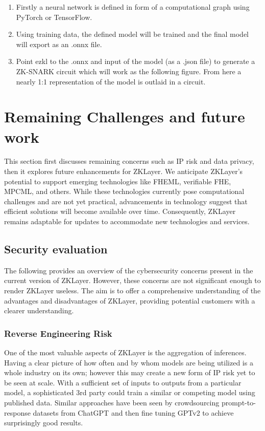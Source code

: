 \documentclass[conference]{IEEEtran}
\begin{document}
\begin{enumerate}

    \item 	Firstly a neural network is defined in form of a computational graph using PyTorch or TensorFlow.

    \item	Using training data, the defined model will be trained and the final model will export as an .onnx file.

    \item	Point ezkl to the .onnx and input of the model (as a .json file) to generate a ZK-SNARK circuit which will work as the following figure. From here a nearly 1:1 representation of the model is outlaid in a circuit.

\end{enumerate}


\section{Remaining Challenges and future work}

This section first discusses remaining concerns such as IP risk and data privacy, then it explores future enhancements for ZKLayer. We anticipate ZKLayer's potential to support emerging technologies like FHEML, verifiable FHE, MPCML, and others. While these technologies currently pose computational challenges and are not yet practical, advancements in technology suggest that efficient solutions will become available over time. Consequently, ZKLayer remains adaptable for updates to accommodate new technologies and services.

\subsection{Security evaluation}

The following provides an overview of the cybersecurity concerns present in the current version of ZKLayer. However, these concerns are not significant enough to render ZKLayer useless. The aim is to offer a comprehensive understanding of the advantages and disadvantages of ZKLayer, providing potential customers with a clearer understanding.

\subsubsection{Reverse Engineering Risk}

One of the most valuable aspects of ZKLayer is the aggregation of inferences. Having a clear picture of how often and by whom models are being utilized is a whole industry on its own; however this may create a new form of IP risk yet to be seen at scale. With a sufficient set of inputs to outputs from a particular model, a sophisticated 3rd party could train a similar or competing model using published data. Similar approaches have been seen by crowdsourcing prompt-to-response datasets from ChatGPT and then fine tuning GPTv2 to achieve surprisingly good results.
\end{document}
